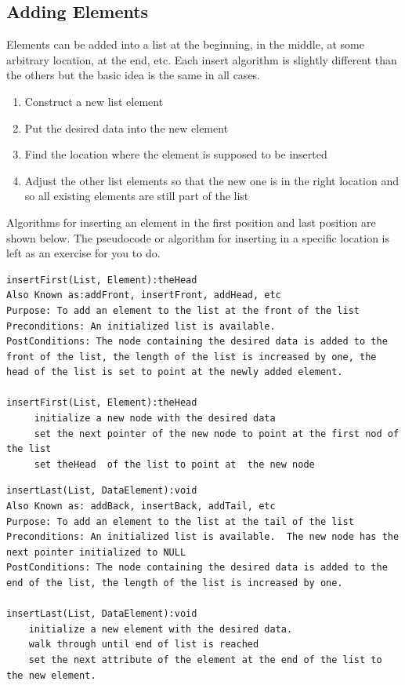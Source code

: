 \subsection{Adding Elements}



 Elements can be added into a list at the 
       beginning, in the middle, at some arbitrary location, at the end, etc. 
       Each insert algorithm is slightly different than the others but the 
       basic idea is the same in all cases.


\begin{enumerate}
	\item Construct a new list element
	\item Put the desired data into the new element
	\item Find the location where the element is supposed to be inserted
	\item Adjust the other list elements so that the new one is in the right 
         location and so all existing elements are still part of the list
\end{enumerate}

 Algorithms for inserting an element in  the first position and last position are shown below.  The pseudocode or algorithm for inserting in a specific location is left as an exercise for you to do.


\begin{lstlisting}
insertFirst(List, Element):theHead
Also Known as:addFront, insertFront, addHead, etc
Purpose: To add an element to the list at the front of the list
Preconditions: An initialized list is available.  
PostConditions: The node containing the desired data is added to the front of the list, the length of the list is increased by one, the head of the list is set to point at the newly added element.

insertFirst(List, Element):theHead
     initialize a new node with the desired data
     set the next pointer of the new node to point at the first nod of the list
     set theHead  of the list to point at  the new node
\end{lstlisting}
   
\begin{lstlisting}
insertLast(List, DataElement):void
Also Known as: addBack, insertBack, addTail, etc
Purpose: To add an element to the list at the tail of the list
Preconditions: An initialized list is available.  The new node has the next pointer initialized to NULL
PostConditions: The node containing the desired data is added to the end of the list, the length of the list is increased by one.

insertLast(List, DataElement):void
	initialize a new element with the desired data.  
	walk through until end of list is reached 
	set the next attribute of the element at the end of the list to the new element.    
\end{lstlisting}


